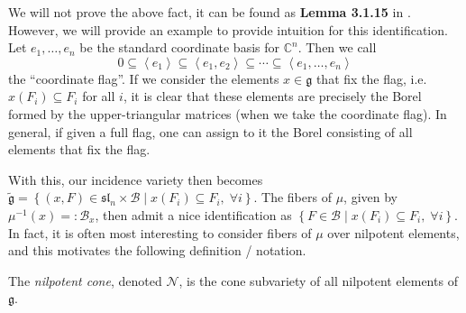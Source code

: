 \documentclass[11pt]{article}
\newcommand{\C}{\mathbb{C}}
\theoremstyle{definition}
\numberwithin{equation}{section} %
\begin{document}
\begin{example}
    We will not prove the above fact, it can be found as \textbf{Lemma 3.1.15} in \cite{ChrissGinzburg2010RepresentationTheoryComplexGeometry}. However, we will provide an example to provide intuition for this identification. Let $e_1, \ldots, e_n$ be the standard coordinate basis for $\C^n$. Then we call
    $$
    0 \subseteq \left\langle e_1\right \rangle \subseteq \left\langle e_1, e_2\right\rangle \subseteq \cdots \subseteq \left\langle e_1, \ldots, e_n\right\rangle 
    $$
    the ``coordinate flag''. If we consider the elements $x\in \mathfrak{g}$ that fix the flag, i.e. $x\left(F_i\right)\subseteq F_i$ for all $i$, it is clear that these elements are precisely the Borel formed by the upper-triangular matrices (when we take the coordinate flag). In general, if given a full flag, one can assign to it the Borel consisting of all elements that fix the flag. 
\end{example}

\smallskip

\noindent With this, our incidence variety then becomes $\tilde{\mathfrak{g}} = \left\{(x,F)\in \mathfrak{sl}_n\times \mathcal{B}\mid x\left(F_i\right)\subseteq F_i,\;\forall i\right\}$. The fibers of $\mu$, given by $\mu^{-1}(x) =: \mathcal{B}_x$, then admit a nice identification as $\left\{F\in  \mathcal{B}\mid x\left(F_i\right)\subseteq F_i,\;\forall i\right\}$. In fact, it is often most interesting to consider fibers of $\mu$ over nilpotent elements, and this motivates the following definition / notation.




\begin{definition}
    The \emph{nilpotent cone}, denoted $\mathcal{N}$, is the cone subvariety of all nilpotent elements of $\mathfrak{g}$.
\end{definition}
\end{document}

